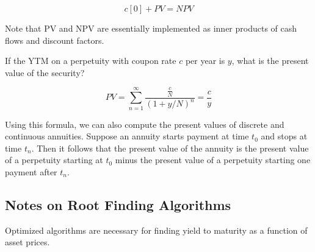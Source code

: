\documentclass[12pt]{scrartcl}
\begin{document}
\[c[0] + PV = NPV\]
\begin{note}
    Note that PV and NPV are essentially implemented as inner products of cash flows and discount factors.
\end{note}




\begin{lemma}
    If the YTM on a perpetuity with coupon rate $c$ per year is $y$, what is the present value of the security?

    \[PV = \sum_{n=1}^\infty \dfrac{\frac{c}{N}}{(1 + y/N)^n} = \frac{c}{y}\]
    
\end{lemma}

Using this formula, we can also compute the present values of discrete and continuous annuities. Suppose an annuity starts payment at time $t_0$ and stops at time $t_n$. Then it follows that the present value of the annuity is the present value of a perpetuity starting at $t_0$ minus the present value of a perpetuity starting one payment after $t_n$.

\subsection{Notes on Root Finding Algorithms}

Optimized algorithms are necessary for finding yield to maturity as a function of asset prices.
\end{document}
